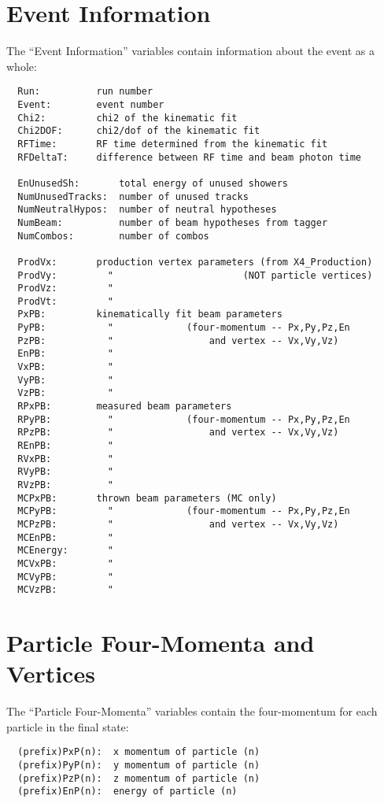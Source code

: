 \documentclass[11pt]{article}
\begin{document}
\section{Event Information}

The ``Event Information'' variables contain information about the event as a whole:

\begin{verbatim}
  Run:          run number
  Event:        event number
  Chi2:         chi2 of the kinematic fit
  Chi2DOF:      chi2/dof of the kinematic fit
  RFTime:       RF time determined from the kinematic fit
  RFDeltaT:     difference between RF time and beam photon time

  EnUnusedSh:       total energy of unused showers
  NumUnusedTracks:  number of unused tracks
  NumNeutralHypos:  number of neutral hypotheses
  NumBeam:          number of beam hypotheses from tagger
  NumCombos:        number of combos

  ProdVx:       production vertex parameters (from X4_Production)
  ProdVy:         "                       (NOT particle vertices)
  ProdVz:         "
  ProdVt:         "
  PxPB:         kinematically fit beam parameters
  PyPB:           "             (four-momentum -- Px,Py,Pz,En
  PzPB:           "                 and vertex -- Vx,Vy,Vz)
  EnPB:           "
  VxPB:           "
  VyPB:           "
  VzPB:           "
  RPxPB:        measured beam parameters
  RPyPB:          "             (four-momentum -- Px,Py,Pz,En
  RPzPB:          "                 and vertex -- Vx,Vy,Vz)
  REnPB:          "
  RVxPB:          "
  RVyPB:          "
  RVzPB:          "
  MCPxPB:       thrown beam parameters (MC only)
  MCPyPB:         "             (four-momentum -- Px,Py,Pz,En
  MCPzPB:         "                 and vertex -- Vx,Vy,Vz)
  MCEnPB:         "
  MCEnergy:       "
  MCVxPB:         "
  MCVyPB:         "
  MCVzPB:         "
\end{verbatim}



\section{Particle Four-Momenta and Vertices}
\label{sec:nt:momentum}

The ``Particle Four-Momenta'' variables contain the four-momentum for each particle in the final state:

\begin{verbatim}
  (prefix)PxP(n):  x momentum of particle (n)
  (prefix)PyP(n):  y momentum of particle (n)
  (prefix)PzP(n):  z momentum of particle (n)
  (prefix)EnP(n):  energy of particle (n)
\end{verbatim}
\end{document}
